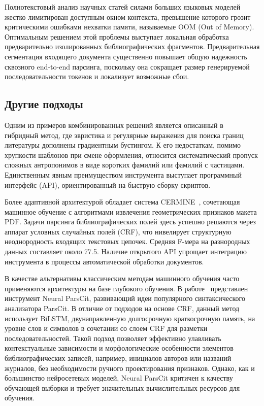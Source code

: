 Полнотекстовый анализ научных статей силами больших языковых моделей жестко лимитирован доступным окном контекста, превышение которого грозит критическими ошибками нехватки памяти, называемые OOM (Out of Memory). Оптимальным решением этой проблемы выступает локальная обработка предварительно изолированных библиографических фрагментов. Предварительная сегментация входящего документа существенно повышает общую надежность сквозного end-to-end парсинга, поскольку она сокращает размер генерируемой последовательности токенов и локализует возможные сбои.

\subsection{Другие подходы}
Одним из примеров комбинированных решений является описанный в~\cite{kopanichuk2025structure} гибридный метод, где эвристика и регулярные выражения для поиска границ литературы дополнены градиентным бустингом. К его недостаткам, помимо хрупкости шаблонов при смене оформления, относится систематический пропуск сложных антропонимов в виде коротких фамилий или фамилий с частицами. Единственным явным преимуществом инструмента выступает программный интерфейс (API), ориентированный на быструю сборку скриптов.

Более адаптивной архитектурой обладает система CERMINE~\cite{tkaczyk2015cermine}, сочетающая машинное обучение с алгоритмами извлечения геометрических признаков макета PDF. Задачи парсинга библиографических полей здесь успешно решаются через аппарат условных случайных полей (CRF), что нивелирует структурную неоднородность входящих текстовых цепочек. Средняя F-мера на разнородных данных составляет около 77.5. Наличие открытого API упрощает интеграцию инструмента в процессы автоматической обработки документов.

В качестве альтернативы классическим методам машинного обучения часто применяются архитектуры на базе глубокого обучения. В работе~\cite{prasad2018neural} представлен инструмент Neural ParsCit, развивающий идеи популярного синтаксического анализатора ParsCit.  В отличие от подходов на основе CRF, данный метод использует BiLSTM, двунаправленную долгосрочную краткосрочную память, на уровне слов и символов в сочетании со слоем CRF для разметки последовательностей. Такой подход позволяет эффективно улавливать контекстуальные зависимости и морфологические особенности элементов библиографических записей, например, инициалов авторов или названий журналов, без необходимости ручного проектирования признаков.  Однако, как и большинство нейросетевых моделей, Neural ParsCit критичен к качеству обучающей выборки и требует значительных вычислительных ресурсов для обучения.

